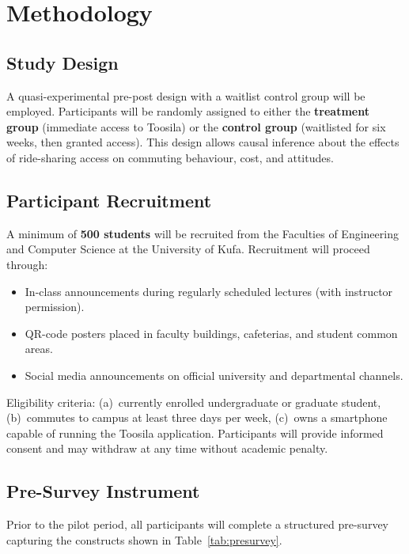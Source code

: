 \documentclass[12pt,a4paper]{article}
\begin{document}
\section{Methodology}
\label{sec:method}

\subsection{Study Design}

A quasi-experimental pre-post design with a waitlist control group will be employed. Participants will be randomly assigned to either the \textbf{treatment group} (immediate access to Toosila) or the \textbf{control group} (waitlisted for six weeks, then granted access). This design allows causal inference about the effects of ride-sharing access on commuting behaviour, cost, and attitudes.

\subsection{Participant Recruitment}

A minimum of \textbf{500 students} will be recruited from the Faculties of Engineering and Computer Science at the University of Kufa. Recruitment will proceed through:

\begin{itemize}[nosep]
  \item In-class announcements during regularly scheduled lectures (with instructor permission).
  \item QR-code posters placed in faculty buildings, cafeterias, and student common areas.
  \item Social media announcements on official university and departmental channels.
\end{itemize}

Eligibility criteria: (a)~currently enrolled undergraduate or graduate student, (b)~commutes to campus at least three days per week, (c)~owns a smartphone capable of running the Toosila application. Participants will provide informed consent and may withdraw at any time without academic penalty.

\subsection{Pre-Survey Instrument}

Prior to the pilot period, all participants will complete a structured pre-survey capturing the constructs shown in Table~\ref{tab:presurvey}.
\end{document}
